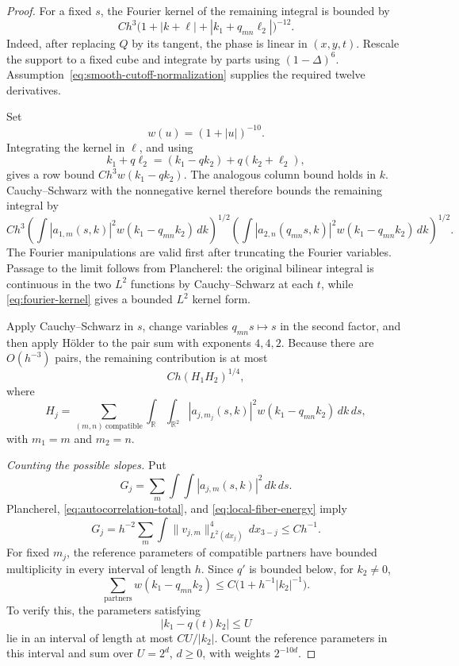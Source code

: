 \documentclass[11pt,a4paper]{article}
\newcommand{\R}{\mathbb R}
\begin{document}
\begin{proof}
For a fixed $s$, the Fourier kernel of the remaining integral is bounded by
\[
Ch^3\bigl(1+|k+\ell|+|k_1+q_{mn}\ell_2|\bigr)^{-12}.
\tag{5.9}\label{eq:fourier-kernel}
\]
Indeed, after replacing $Q$ by its tangent, the phase is linear in
$(x,y,t)$. Rescale the support to a fixed cube and integrate by parts
using $(1-\Delta)^6$. Assumption~\eqref{eq:smooth-cutoff-normalization}
supplies the required twelve derivatives.

Set
\[
w(u)=(1+|u|)^{-10}.
\]
Integrating the kernel in $\ell$, and using
\[
k_1+q\ell_2=(k_1-qk_2)+q(k_2+\ell_2),
\]
gives a row bound $Ch^3w(k_1-qk_2)$. The analogous column bound holds in
$k$. Cauchy--Schwarz with the nonnegative kernel therefore bounds the
remaining integral by
\[
Ch^3
\left(\int|a_{1,m}(s,k)|^2w(k_1-q_{mn}k_2)\,dk\right)^{1/2}
\left(\int|a_{2,n}(q_{mn}s,k)|^2w(k_1-q_{mn}k_2)\,dk\right)^{1/2}.
\tag{5.10}\label{eq:weighted-correlation}
\]
The Fourier manipulations are valid first after truncating the Fourier
variables. Passage to the limit follows from Plancherel: the original
bilinear integral is continuous in the two $L^2$ functions by
Cauchy--Schwarz at each $t$, while \eqref{eq:fourier-kernel} gives a bounded
$L^2$ kernel form.

Apply Cauchy--Schwarz in $s$, change variables $q_{mn}s\mapsto s$ in the
second factor, and then apply H\"older to the pair sum with exponents
$4,4,2$. Because there are $O(h^{-3})$ pairs, the remaining contribution
is at most
\[
Ch(H_1H_2)^{1/4},
\tag{5.11}\label{eq:correlation-sum}
\]
where
\[
H_j=\sum_{(m,n)\ \mathrm{compatible}}
\int_{\R}\int_{\R^2}|a_{j,m_j}(s,k)|^2
w(k_1-q_{mn}k_2)\,dk\,ds,
\]
with $m_1=m$ and $m_2=n$.

\medskip
\noindent\textit{Counting the possible slopes.}
Put
\[
G_j=\sum_m\int\!\!\int|a_{j,m}(s,k)|^2\,dk\,ds.
\]
Plancherel, \eqref{eq:autocorrelation-total}, and
\eqref{eq:local-fiber-energy} imply
\[
G_j=h^{-2}\sum_m\int\|v_{j,m}\|_{L^2(dx_j)}^4\,dx_{3-j}
\leq Ch^{-1}.
\tag{5.12}\label{eq:total-fourier-energy}
\]
For fixed $m_j$, the reference parameters of compatible partners have
bounded multiplicity in every interval of length $h$. Since $q'$ is
bounded below, for $k_2\neq0$,
\[
\sum_{\text{partners}}w(k_1-q_{mn}k_2)
\leq C\bigl(1+h^{-1}|k_2|^{-1}\bigr).
\tag{5.13}\label{eq:slope-count}
\]
To verify this, the parameters satisfying
\[
|k_1-q(t)k_2|\leq U
\]
lie in an interval of length at most $CU/|k_2|$. Count the reference
parameters in this interval and sum over $U=2^d$, $d\geq0$, with weights
$2^{-10d}$.


\end{proof}
\end{document}
